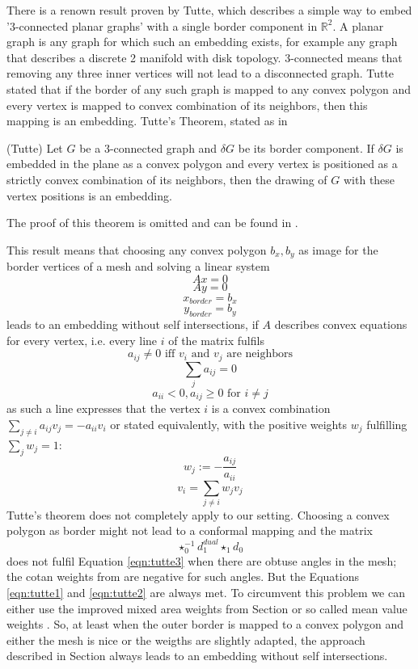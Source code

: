 There is a renown result proven by Tutte, which describes a simple way to embed '3-connected planar graphs' with a single border component in $\mathbb R^2$. A planar graph is any graph for which such an embedding exists, for example any graph that describes a discrete 2 manifold with disk topology. 3-connected means that removing any three inner vertices will not lead to a disconnected graph. Tutte stated that if the border of any such graph is mapped to any convex polygon and every vertex is mapped to convex combination of its neighbors, then this mapping is an embedding. Tutte's Theorem, stated as in 

\begin{thm}(Tutte) Let $G$ be a $3$-connected graph and $\delta G$ be its border component. If $\delta G$ is embedded in the plane as a convex polygon and every vertex is positioned as a strictly convex combination of its neighbors, then the drawing of $G$ with these vertex positions is an embedding.
\end{thm}
The proof of this theorem is omitted and can be found in . 

This result means that choosing any convex polygon $b_x, b_y$ as image for the border vertices of a mesh and solving a linear system
\[Ax = 0\]
\[Ay = 0\]
\[x_{border} = b_x\]
\[y_{border} = b_y\]
leads to an embedding without self intersections, if $A$ describes convex equations for every vertex, i.e. every line $i$ of the matrix fulfils
\begin{equation}
a_{ij} \neq 0 \text{ iff $v_i$ and $v_j$ are neighbors} \label{eqn:tutte1}
\end{equation}
\begin{equation}
\sum_{j} a_{ij} = 0\label{eqn:tutte2}
\end{equation}
\begin{equation}
a_{ii} <0, a_{ij} \geq 0 \text{ for $i\neq j$}\label{eqn:tutte3}
\end{equation}
as such a line expresses that the vertex $i$ is a convex combination $\sum_{j\neq i} a_{ij} v_j = -a_{ii}v_i$ or stated equivalently, with the positive weights $w_j$ fulfilling $\sum_{j} w_j = 1$:
\[w_j := -\frac{a_{ij}}{a_{ii}}\]
\[v_i = \sum_{j \neq i} w_j v_j\]
Tutte's theorem does not completely apply to our setting. Choosing a convex polygon as border might not lead to a conformal mapping and the matrix
\[\star_0^{-1} d_1^{dual} \star_1 d_0\]
does not fulfil Equation \ref{eqn:tutte3} when there are obtuse angles in the mesh; the cotan weights from  are negative for such angles. But the Equations \ref{eqn:tutte1} and \ref{eqn:tutte2} are always met. 
To circumvent this problem we can either use the improved mixed area weights from Section  or so called mean value weights . So, at least when the outer border is mapped to a convex polygon and either the mesh is nice or the weigths are slightly adapted, the approach described in Section  always leads to an embedding without self intersections.

